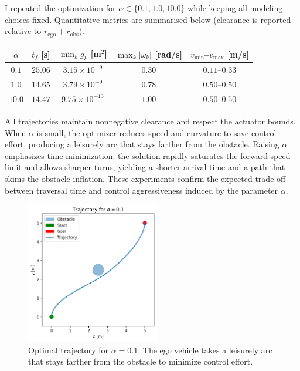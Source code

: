 \documentclass [11pt]{article}
\begin{document}
\begin{enumerate}[label=(\roman*)]
        I repeated the optimization for $\alpha \in \{0.1, 1.0, 10.0\}$ while keeping all modeling choices fixed. Quantitative metrics are summarised below (clearance is reported relative to $r_{\text{ego}} + r_{\text{obs}}$).
        \begin{center}
            \begin{tabular}{c c c c c}
                $\alpha$ & $t_f$ [s] & $\min_k g_k$ [m$^2$] & $\max_k |{\omega_k}|$ [rad/s] & $v_{\min}$--$v_{\max}$ [m/s]\\
                \hline
                $0.1$ & $25.06$ & $3.15\times 10^{-9}$ & $0.30$ & $0.11$--$0.33$ \\
                $1.0$ & $14.65$ & $3.79\times 10^{-9}$ & $0.78$ & $0.50$--$0.50$ \\
                $10.0$ & $14.47$ & $9.75\times 10^{-13}$ & $1.00$ & $0.50$--$0.50$
            \end{tabular}
        \end{center}
        All trajectories maintain nonnegative clearance and respect the actuator bounds. When $\alpha$ is small, the optimizer reduces speed and curvature to save control effort, producing a leisurely arc that stays farther from the obstacle. Raising $\alpha$ emphasizes time minimization: the solution rapidly saturates the forward-speed limit and allows sharper turns, yielding a shorter arrival time and a path that skims the obstacle inflation. These experiments confirm the expected trade-off between traversal time and control aggressiveness induced by the parameter $\alpha$.

        \begin{figure}[H]
            \centering
            \includegraphics[width=0.52\textwidth]{figs/p1_traj_alpha_0p1.png}
            \caption{Optimal trajectory for $\alpha = 0.1$. The ego vehicle takes a leisurely arc that stays farther from the obstacle to minimize control effort.}
            \label{fig:p1_alpha01}
        \end{figure}


\end{enumerate}
\end{document}
